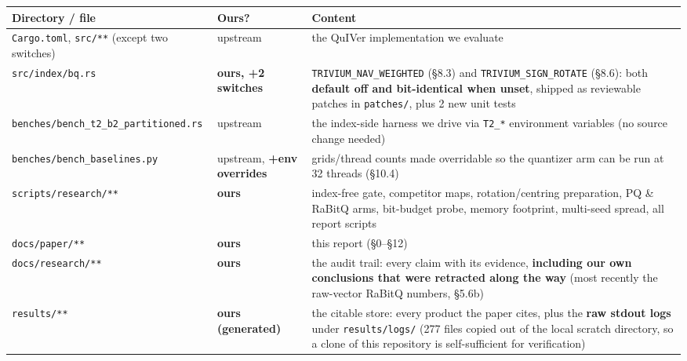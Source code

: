 \documentclass[
  10pt,
]{article}
\newcounter{none} %
\begin{document}
{\def\LTcaptype{none} %
\begin{longtable}[]{@{}
  >{\raggedright\arraybackslash}p{}
  >{\raggedright\arraybackslash}p{}
  >{\raggedright\arraybackslash}p{}@{}}
\toprule\noalign{}
\begin{minipage}[b]{\linewidth}\raggedright
Directory / file
\end{minipage} & \begin{minipage}[b]{\linewidth}\raggedright
Ours?
\end{minipage} & \begin{minipage}[b]{\linewidth}\raggedright
Content
\end{minipage} \\
\midrule\noalign{}
\endhead
\bottomrule\noalign{}
\endlastfoot
\texttt{Cargo.toml}, \texttt{src/**} (except two switches) & upstream &
the QuIVer implementation we evaluate \\
\texttt{src/index/bq.rs} & \textbf{ours, +2 switches} &
\texttt{TRIVIUM\_NAV\_WEIGHTED} (§8.3) and
\texttt{TRIVIUM\_SIGN\_ROTATE} (§8.6): both \textbf{default off and
bit-identical when unset}, shipped as reviewable patches in
\texttt{patches/}, plus 2 new unit tests \\
\texttt{benches/bench\_t2\_b2\_partitioned.rs} & upstream & the
index-side harness we drive via \texttt{T2\_*} environment variables (no
source change needed) \\
\texttt{benches/bench\_baselines.py} & upstream, \textbf{+env overrides}
& grids/thread counts made overridable so the quantizer arm can be run
at 32 threads (§10.4) \\
\texttt{scripts/research/**} & \textbf{ours} & index-free gate,
competitor maps, rotation/centring preparation, PQ \& RaBitQ arms,
bit-budget probe, memory footprint, multi-seed spread, all report
scripts \\
\texttt{docs/paper/**} & \textbf{ours} & this report (§0--§12) \\
\texttt{docs/research/**} & \textbf{ours} & the audit trail: every claim
with its evidence, \textbf{including our own conclusions that were
retracted along the way} (most recently the raw-vector RaBitQ numbers,
§5.6b) \\
\texttt{results/**} & \textbf{ours (generated)} & the citable store:
every product the paper cites, plus the \textbf{raw stdout logs} under
\texttt{results/logs/} (277 files copied out of the local scratch
directory, so a clone of this repository is self-sufficient for
verification) \\
\end{longtable}
}
\end{document}
